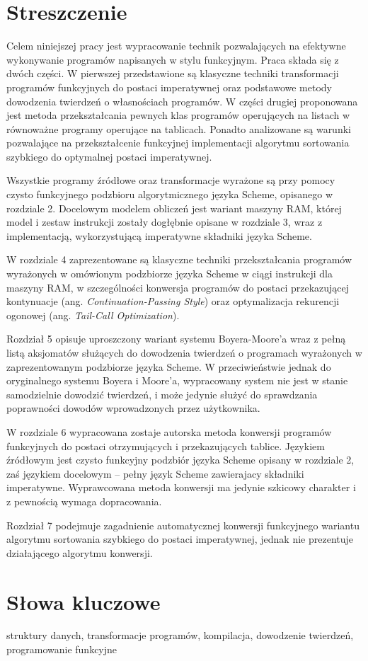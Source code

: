 \section*{Streszczenie}

Celem niniejszej pracy jest wypracowanie technik pozwalających
na efektywne wykonywanie programów napisanych w stylu funkcyjnym.
Praca składa się z dwóch części. W pierwszej przedstawione są klasyczne
techniki transformacji programów funkcyjnych do postaci imperatywnej
oraz podstawowe metody dowodzenia twierdzeń o własnościach programów.
W części drugiej proponowana jest metoda przekształcania pewnych klas
programów operujących na listach w równoważne programy operujące na
tablicach. Ponadto analizowane są warunki pozwalające na przekształcenie
funkcyjnej implementacji algorytmu sortowania szybkiego do optymalnej
postaci imperatywnej.

Wszystkie programy źródłowe oraz transformacje wyrażone są przy pomocy
czysto funkcyjnego podzbioru algorytmicznego języka Scheme, opisa\-nego
w rozdziale 2. Docelowym modelem obliczeń jest wariant maszyny RAM, której
model i zestaw instrukcji zostały dogłębnie opisane w rozdziale 3, wraz
z implementacją, wykorzystującą imperatywne składniki języka Sche\-me.

W rozdziale 4 zaprezentowane są klasyczne techniki
przekształcania programów wyrażonych w omówionym podzbiorze języka
Scheme w ciągi instrukcji dla maszyny RAM, w szczególności konwersja
programów do postaci przekazującej kontynuacje (ang. \textit{Continuation-Passing
  Style}) oraz optymalizacja rekurencji ogonowej (ang. \textit{Tail-Call
  Optimization}).

Rozdział 5 opisuje uproszczony wariant systemu Boyera-Moore'a wraz
z pełną listą aksjomatów służących do dowodzenia twierdzeń o programach
wyrażonych w zaprezentowanym podzbiorze języka Scheme. W przeciwieństwie
jednak do oryginalnego systemu Boyera i Moore'a, wypracowany system nie
jest w stanie samodzielnie dowodzić twierdzeń, i może jedynie służyć
do sprawdzania poprawności dowodów wprowadzonych przez użytkownika.

W rozdziale 6 wypracowana zostaje autorska metoda konwersji programów
funkcyjnych do postaci otrzymujących i przekazujących tablice. Językiem
źródłowym jest czysto funkcyjny podzbiór języka Scheme opisany w rozdziale
2, zaś językiem docelowym -- pełny język Scheme zawierajacy składniki
imperatywne. Wyprawcowana metoda konwersji ma jedynie szkicowy charakter
i z pewnością wymaga dopracowania.

Rozdział 7 podejmuje zagadnienie automatycznej konwersji funkcyjnego
wariantu algorytmu sortowania szybkiego do postaci imperatywnej,
jednak nie prezentuje działającego algorytmu konwersji.

\section*{Słowa kluczowe}
struktury danych, transformacje programów, kompilacja, dowodzenie twierdzeń,
programowanie funkcyjne
